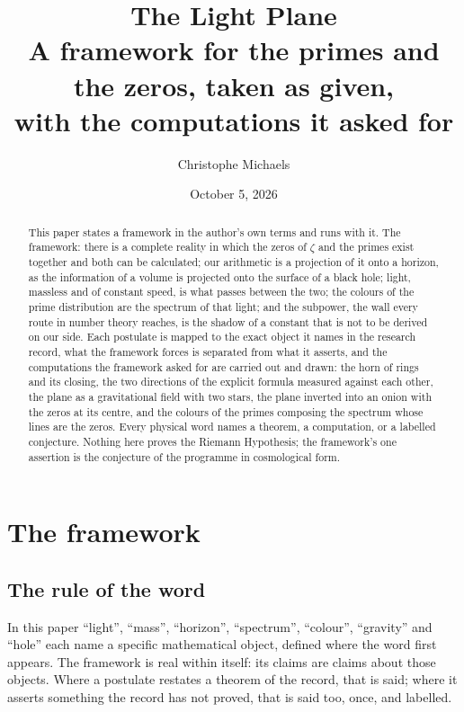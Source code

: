 \documentclass[11pt]{article}
\title{The Light Plane\\ \large A framework for the primes and the zeros, taken as given,\\ with the computations it asked for}
\author{Christophe Michaels}
\date{October 5, 2026}
\theoremstyle{definition}
\theoremstyle{remark}
\begin{document}
\maketitle

\begin{abstract}
\noindent This paper states a framework in the author's own terms and runs with it. The framework: there is a complete reality in which the zeros of $\zeta$ and the primes exist together and both can be calculated; our arithmetic is a projection of it onto a horizon, as the information of a volume is projected onto the surface of a black hole; light, massless and of constant speed, is what passes between the two; the colours of the prime distribution are the spectrum of that light; and the subpower, the wall every route in number theory reaches, is the shadow of a constant that is not to be derived on our side. Each postulate is mapped to the exact object it names in the research record, what the framework forces is separated from what it asserts, and the computations the framework asked for are carried out and drawn: the horn of rings and its closing, the two directions of the explicit formula measured against each other, the plane as a gravitational field with two stars, the plane inverted into an onion with the zeros at its centre, and the colours of the primes composing the spectrum whose lines are the zeros. Every physical word names a theorem, a computation, or a labelled conjecture. Nothing here proves the Riemann Hypothesis; the framework's one assertion is the conjecture of the programme in cosmological form.
\end{abstract}

\tableofcontents

\section{The framework}\label{sec:framework}

\subsection{The rule of the word}
In this paper ``light'', ``mass'', ``horizon'', ``spectrum'', ``colour'', ``gravity'' and ``hole'' each name a specific mathematical object, defined where the word first appears. The framework is real within itself: its claims are claims about those objects. Where a postulate restates a theorem of the record, that is said; where it asserts something the record has not proved, that is said too, once, and labelled.
\end{document}
